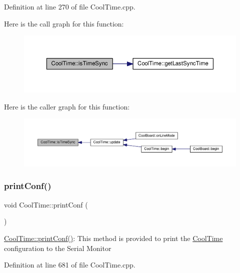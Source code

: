 Definition at line 270 of file Cool\+Time.\+cpp.

Here is the call graph for this function\+:
\nopagebreak
\begin{figure}[H]
\begin{center}
\leavevmode
\includegraphics[width=350pt]{class_cool_time_a5ae038a4498602b189f76a10bf02adf8_cgraph}
\end{center}
\end{figure}
Here is the caller graph for this function\+:
\nopagebreak
\begin{figure}[H]
\begin{center}
\leavevmode
\includegraphics[width=350pt]{class_cool_time_a5ae038a4498602b189f76a10bf02adf8_icgraph}
\end{center}
\end{figure}
\mbox{\label{class_cool_time_af355e7f9b3898211cd2ff25eab5933b1}} 
\subsubsection{\texorpdfstring{print\+Conf()}{printConf()}}
{\footnotesize\ttfamily void Cool\+Time\+::print\+Conf (\begin{DoxyParamCaption}{ }\end{DoxyParamCaption})}

\hyperlink{class_cool_time_af355e7f9b3898211cd2ff25eab5933b1}{Cool\+Time\+::print\+Conf()}\+: This method is provided to print the \hyperlink{class_cool_time}{Cool\+Time} configuration to the Serial Monitor 

Definition at line 681 of file Cool\+Time.\+cpp.

